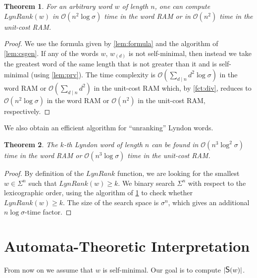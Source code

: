\documentclass{article}
\newcommand{\mayqed}{}
\newcommand{\Oh}{\mathcal{O}}
\newcommand{\CS}{\mbox{\large{\sf{S}}}}
\newcommand{\Lynd}{\mathit{LynRank}}
\newtheorem{theorem}{Theorem}
\theoremstyle{definition}
\theoremstyle{remark}
\begin{document}
\begin{theorem}\label{thm:lynd}
  For an arbitrary word $w$ of length $n$, one can compute $\Lynd(w)$  in $\Oh(n^2\log\sigma)$ time in the word RAM or
  in $\Oh(n^2)$ time in the unit-cost RAM.
\end{theorem}
\begin{proof}
  We use the formula given by \cref{lem:formula} and the algorithm of \cref{lem:csgen}.
  If any of the words $w$, $w_{(d)}$ is not self-minimal, then instead we take the greatest word of the same length that is
  not greater than it and is self-minimal (using \cref{lem:prv}).
  The time complexity is $\Oh(\sum_{d \mid n}d^2\log \sigma)$ in the word RAM
  or $\Oh(\sum_{d \mid n}d^2)$ in the unit-cost RAM which, by \cref{fct:div}, reduces to $\Oh(n^2 \log \sigma)$ in the word RAM
  or $\Oh(n^2)$ in the unit-cost RAM, respectively.
\mayqed\end{proof}

We also obtain an efficient algorithm for ``unranking'' Lyndon words.

\begin{theorem}\label{thm:kth}
  The $k$-th Lyndon word of length $n$ can be found in $\Oh(n^3\log^2\sigma)$ time in the word RAM
  or $\Oh(n^3 \log\sigma)$ time in the unit-cost RAM.
\end{theorem}
\begin{proof}
  By definition of the $\Lynd$ function, we are looking for the smallest $w\in \Sigma^n$  such that $\Lynd(w)\ge k$.
  We binary search $\Sigma^n$ with respect to the lexicographic order, using the algorithm of \cref{thm:lynd}
  to check whether $\Lynd(w)\ge k$.
  The size of the search space is $\sigma^n$,  which gives an additional $n\log\sigma$-time factor.
\mayqed\end{proof}









\section{Automata-Theoretic Interpretation}\label{sec:auto}
From now on we assume that $w$ is self-minimal.
Our goal is to compute $|\CS(w)|$.
\end{document}
